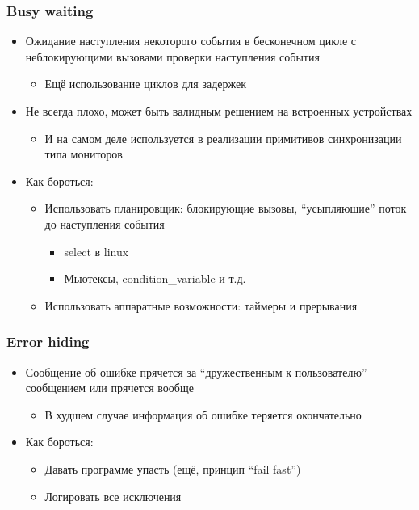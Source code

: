 \documentclass[xetex,mathserif,serif]{beamer}
\begin{document}
    \begin{frame}
        \frametitle{Busy waiting}
        \begin{itemize}
            \item Ожидание наступления некоторого события в бесконечном цикле с неблокирующими вызовами проверки наступления события
            \begin{itemize}
                \item Ещё использование циклов для задержек
            \end{itemize}
            \item Не всегда плохо, может быть валидным решением на встроенных устройствах
            \begin{itemize}
                \item И на самом деле используется в реализации примитивов синхронизации типа мониторов
            \end{itemize}
            \item Как бороться:
            \begin{itemize}
                \item Использовать планировщик: блокирующие вызовы, ``усыпляющие'' поток до наступления события
                \begin{itemize}
                    \item select в linux
                    \item Мьютексы, condition\_variable и т.д.
                \end{itemize}
                \item Использовать аппаратные возможности: таймеры и прерывания
            \end{itemize}
        \end{itemize}
    \end{frame}

    \begin{frame}
        \frametitle{Error hiding}
        \begin{itemize}
            \item Сообщение об ошибке прячется за ``дружественным к пользователю'' сообщением или прячется вообще
            \begin{itemize}
                \item В худшем случае информация об ошибке теряется окончательно
            \end{itemize}
            \item Как бороться:
            \begin{itemize}
                \item Давать программе упасть (ещё, принцип ``fail fast'')
                \item Логировать все исключения
            \end{itemize}
        \end{itemize}
    \end{frame}
\end{document}
